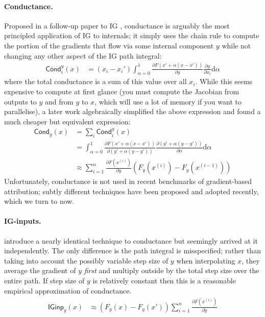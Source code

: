 \documentclass{article}
\theoremstyle{plain}
\theoremstyle{definition}
\theoremstyle{remark}
\begin{document}
\paragraph{Conductance.} Proposed in a follow-up paper to IG \citep{dhamdhere2019how}, conductance is arguably the most principled application of IG to internals; it simply uses the chain rule to compute the portion of the gradients that flow via some internal component $y$ while not changing any other aspect of the IG path integral:
\begin{align}
\mathsf{Cond}_i^y(x) &= (x_i - x_i') \int_{\alpha=0}^{1}\frac{\partial F(x' + \alpha(x - x'))}{\partial y}\frac{\partial y}{\partial x_i}\mathrm{d}\alpha
\end{align}
where the total conductance is a sum of this value over all $x_i$. While this seems expensive to compute at first glance (you must compute the Jacobian from outputs to $y$ and from $y$ to $x$, which will use a lot of memory if you want to parallelise), a later work \citep{shrikumar2018computationally} algebraically simplified the above expression and found a much cheaper but equivalent expression:
\begin{align}
\mathsf{Cond}_y(x) &= \sum_{i}\mathsf{Cond}_i^y(x)\\
&= \int_{\alpha=0}^1\frac{\partial F(x' + \alpha(x - x'))}{\partial (y' + \alpha(y - y'))}\frac{\partial (y' + \alpha(y - y'))}{\partial \alpha} \mathrm{d}\alpha \\
&\approx \sum_{i=1}^n\frac{\partial F(x^{(i)})}{\partial y}(F_y(x^{(i)}) - F_y(x^{(i - 1)}))
\end{align}
Unfortunately, conductance is not used in recent benchmarks of gradient-based attribution; subtly different techniques have been proposed and adopted recently, which we turn to now.

\paragraph{IG-inputs.} \citet{hanna2024faith} introduce a nearly identical technique to conductance but seemingly arrived at it independently. The only difference is the path integral is misspecified; rather than taking into account the possibly variable step size of $y$ when interpolating $x$, they average the gradient of $y$ \textit{first} and multiply outside by the total step size over the entire path. If step size of $y$ is relatively constant then this is a reasonable empirical approximation of conductance.
\begin{align}
\mathsf{IGinp}_y(x) &\approx (F_y(x) - F_y(x'))\sum_{i=1}^n\frac{\partial F(x^{(i)})}{\partial y}
\end{align}
\end{document}
